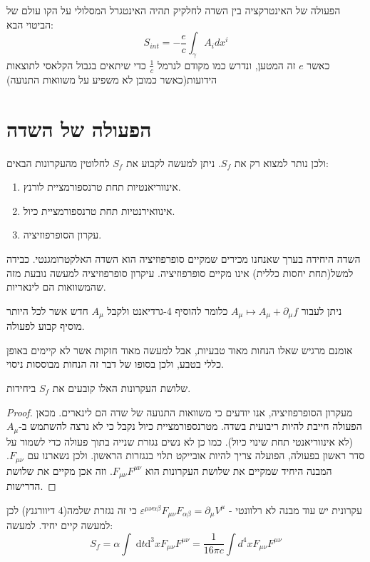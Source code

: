 \documentclass{tstextbook}
\begin{document}
הפעולה של האינטרקציה בין השדה לחלקיק תהיה האינטגרל המסלולי על הקו עולם של הביטוי הבא:
$$S_{int}=-\frac{e}{c} \int_{\gamma} A_{i} dx^i$$
כאשר \(e\) זה המטען, ונדרש כמו מקודם לנרמל \(\frac{1}{c}\) כדי שיתאים בגבול הקלאסי לתוצאות הידועות(כאשר כמובן לא משפיע על משוואות התנועה)

\section{הפעולה של השדה}

ולכן נותר למצוא רק את \(S_{f}\). ניתן למעשה לקבוע את \(S_{f}\) לחלוטין מהעקרונות הבאים:

\begin{enumerate}
  \item אינווריאנטיות תחת טרנספורמציית לורנץ. 


  \item אינוואירנטיות תחת טרנספורמציית כיול. 


  \item עקרון הסופרפוזיציה.  


\end{enumerate}
\begin{remark}
השדה היחידה בערך שאנחנו מכירים שמקיים סופרפוזיציה הוא השדה האלקטרומגנטי. כבידה למשל(תחת יחסות כללית) אינו מקיים סופרפוזיציה. עיקרון סופרפוזיציה למעשה נובעת מזה שהמשוואות הם לינאריות.

\end{remark}
\begin{definition}
ניתן לעבור \(A_{\mu}\mapsto A_{\mu}+\partial_{\mu}f\) כלומר להוסיף 4-גרדיאנט ולקבל \(A_{\mu}\) חדש אשר לכל היותר מוסיף קבוע לפעולה.

\end{definition}
אומנם מרגיש שאלו הנחות מאוד טבעיות, אבל למעשה מאוד חזקות אשר לא קיימים באופן כללי בטבע, ולכן בסופו של דבר זה הנחות מבוססות ניסוי.

\begin{proposition}
שלושת העקרונות האלו קובעים את \(S_{f}\) ביחידות.

\end{proposition}
\begin{proof}
מעקרון הסופרפוזיציה, אנו יודעים כי משוואות התנועה של שדה הם לינארים. מכאן הפעולה חייבת להיות ריבועית בשדה. 
מטרנספורמציית כיול נקבל כי לא נרצה להשתמש ב-\(A_{\mu}\)(לא אינווריאנטי תחת שינוי כיול).
כמו כן לא נשים נגזרת שנייה בתוך פעולה כדי לשמור על סדר ראשון בפעולה, הפועלה צריך להיות אובייקט תלוי בנגזרות הראשון. ולכן נשארנו עם \(F_{\mu \nu}\). 
המבנה היחיד שמקיים את שלושת העקרונות הוא \(F_{\mu \nu}F^{\mu \nu}\). וזה אכן מקיים את שלושת הדרישות. 

\end{proof}
עקרונית יש עוד מבנה לא רלוונטי - \(\varepsilon^{\mu \nu \alpha \beta}F_{\mu \nu}F_{\alpha \beta}=\partial_{\mu}V^\mu\) כי זה נגזרת שלמה(4 דיוורגנץ)
לכן למעשה קיים יחיד. למעשה:
$$S_{f}=\alpha\int \;\mathrm{d}t\mathrm{d}^3xF_{\mu \nu}F^{\mu \nu}=\frac{1}{16\pi c}\int d^4x F_{\mu \nu}F^{\mu \nu}$$
\end{document}
